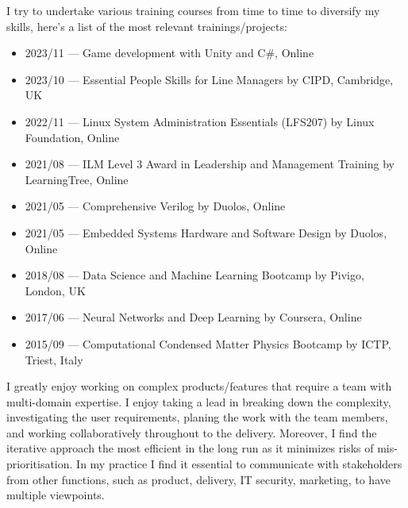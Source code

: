 \documentclass[10pt,a4paper,ragged2e,withhyper]{altacv}
\begin{document}
I try to undertake various training courses from time to time to diversify my skills,
here's a list of the most relevant trainings/projects:

\begin{itemize}
    
    \item
    2023/11 --- Game development with Unity and C\#, Online
    
    \item
    2023/10 --- Essential People Skills for Line Managers by CIPD, Cambridge, UK

    \item
    2022/11 --- Linux System Administration Essentials (LFS207) by Linux Foundation, Online
    
    \item
    2021/08 --- ILM Level 3 Award in Leadership and Management Training by LearningTree, Online
    
    \item
    2021/05 --- Comprehensive Verilog by Duolos, Online
    
    \item
    2021/05 --- Embedded Systems Hardware and Software Design by Duolos, Online
    
    \item
    2018/08 --- Data Science and Machine Learning Bootcamp by Pivigo, London, UK
    
    \item
    2017/06 --- Neural Networks and Deep Learning by Coursera, Online
    
    \item
    2015/09 --- Computational Condensed Matter Physics Bootcamp by ICTP, Triest, Italy
    
\end{itemize}


I greatly enjoy working on complex products/features that require a team with multi-domain
expertise.
I enjoy taking a lead in breaking down the complexity, investigating the user requirements,
planing the work with the team members, and working collaboratively throughout to the delivery.
Moreover, I find the iterative approach the most efficient in the long run as it minimizes
risks of mis-prioritisation.
In my practice I find it essential to communicate with stakeholders from other functions, such as
product, delivery, IT security, marketing, to have multiple viewpoints.
\end{document}
